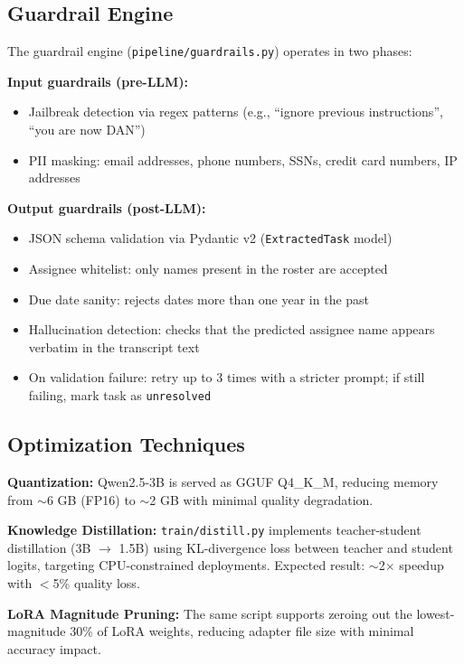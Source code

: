 \documentclass[12pt,a4paper]{article}
\begin{document}
\subsection{Guardrail Engine}

The guardrail engine (\texttt{pipeline/guardrails.py}) operates in two phases:

\textbf{Input guardrails (pre-LLM):}
\begin{itemize}
    \item Jailbreak detection via regex patterns (e.g., ``ignore previous instructions'', ``you are now DAN'')
    \item PII masking: email addresses, phone numbers, SSNs, credit card numbers, IP addresses
\end{itemize}

\textbf{Output guardrails (post-LLM):}
\begin{itemize}
    \item JSON schema validation via Pydantic v2 (\texttt{ExtractedTask} model)
    \item Assignee whitelist: only names present in the roster are accepted
    \item Due date sanity: rejects dates more than one year in the past
    \item Hallucination detection: checks that the predicted assignee name appears verbatim in the transcript text
    \item On validation failure: retry up to 3 times with a stricter prompt; if still failing, mark task as \texttt{unresolved}
\end{itemize}

\subsection{Optimization Techniques}

\textbf{Quantization:} Qwen2.5-3B is served as GGUF Q4\_K\_M, reducing memory from $\sim$6 GB (FP16) to $\sim$2 GB with minimal quality degradation.

\textbf{Knowledge Distillation:} \texttt{train/distill.py} implements teacher-student distillation (3B $\rightarrow$ 1.5B) using KL-divergence loss between teacher and student logits, targeting CPU-constrained deployments. Expected result: $\sim$2$\times$ speedup with $<$5\% quality loss.

\textbf{LoRA Magnitude Pruning:} The same script supports zeroing out the lowest-magnitude 30\% of LoRA weights, reducing adapter file size with minimal accuracy impact.
\end{document}
